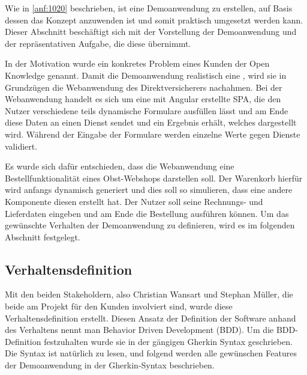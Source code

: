 
Wie in \autoref{anf:1020} beschrieben, ist eine Demoanwendung zu erstellen, auf Basis dessen das Konzept anzuwenden ist und somit praktisch umgesetzt werden kann. Dieser Abschnitt beschäftigt sich mit der Vorstellung der Demoanwendung und der repräsentativen Aufgabe, die diese übernimmt.

In der Motivation wurde ein konkretes Problem eines Kunden der Open Knowledge genannt. Damit die Demoanwendung realistisch eine , wird sie in Grundzügen die Webanwendung des Direktversicherers nachahmen. Bei der Webanwendung handelt es sich um eine mit Angular erstellte SPA, die den Nutzer verschiedene teils dynamische Formulare ausfüllen lässt und am Ende diese Daten an einen Dienst sendet und ein Ergebnis erhält, welches dargestellt wird. Während der Eingabe der Formulare werden einzelne Werte gegen Dienste validiert.

Es wurde sich dafür entschieden, dass die Webanwendung eine Bestellfunktionalität eines Obst-Webshops darstellen soll. Der Warenkorb hierfür wird anfangs dynamisch generiert und dies soll so simulieren, dass eine andere Komponente diesen erstellt hat. Der Nutzer soll seine Rechnungs- und Lieferdaten eingeben und am Ende die Bestellung ausführen können. Um das gewünschte Verhalten der Demoanwendung zu definieren, wird es im folgenden Abschnitt festgelegt.

\subsection{Verhaltensdefinition}

Mit den beiden Stakeholdern, also Christian Wansart und Stephan Müller, die beide am Projekt für den Kunden involviert sind, wurde diese Verhaltensdefinition erstellt. Diesen Ansatz der Definition der Software anhand des Verhaltens nennt man Behavior Driven Development (BDD). Um die BDD-Definition festzuhalten wurde sie in der gängigen Gherkin \cite{Gherkin} Syntax geschrieben. Die Syntax ist natürlich zu lesen, und folgend werden alle gewünschen Features der Demoanwendung in der Gherkin-Syntax beschrieben.

